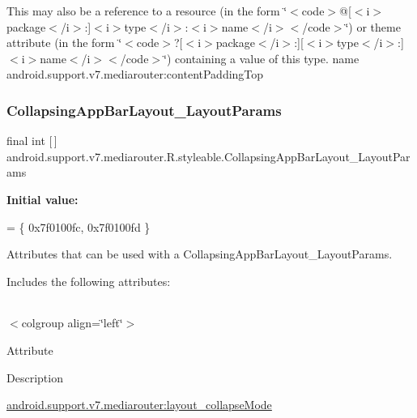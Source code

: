 This may also be a reference to a resource (in the form \char`\"{}$<$code$>$@\mbox{[}$<$i$>$package$<$/i$>$\+:\mbox{]}$<$i$>$type$<$/i$>$\+:$<$i$>$name$<$/i$>$$<$/code$>$\char`\"{}) or theme attribute (in the form \char`\"{}$<$code$>$?\mbox{[}$<$i$>$package$<$/i$>$\+:\mbox{]}\mbox{[}$<$i$>$type$<$/i$>$\+:\mbox{]}$<$i$>$name$<$/i$>$$<$/code$>$\char`\"{}) containing a value of this type.  name android.\+support.\+v7.\+mediarouter\+:content\+Padding\+Top \mbox{\label{classandroid_1_1support_1_1v7_1_1mediarouter_1_1R_1_1styleable_a3a8fc0e8f0991d8f2645deeb9a8cfbb6}} 
\subsubsection{\texorpdfstring{Collapsing\+App\+Bar\+Layout\+\_\+\+Layout\+Params}{CollapsingAppBarLayout\_LayoutParams}}
{\footnotesize\ttfamily final int \mbox{[}$\,$\mbox{]} android.\+support.\+v7.\+mediarouter.\+R.\+styleable.\+Collapsing\+App\+Bar\+Layout\+\_\+\+Layout\+Params\hspace{0.3cm}{\ttfamily [static]}}

{\bfseries Initial value\+:}
\begin{DoxyCode}
= \{
            0x7f0100fc, 0x7f0100fd
        \}
\end{DoxyCode}
Attributes that can be used with a Collapsing\+App\+Bar\+Layout\+\_\+\+Layout\+Params. 

Includes the following attributes\+:

\tabulinesep=1mm
\begin{longtabu} spread 0pt [c]{*{0}{|X[-1]}|}
\hline
\end{longtabu}
$<$colgroup align=\char`\"{}left\char`\"{}$>$ 

Attribute

Description 

{\ttfamily \hyperlink{classandroid_1_1support_1_1v7_1_1mediarouter_1_1R_1_1styleable_a3e5fbc3ee8d75862d538595291dd486d}{android.\+support.\+v7.\+mediarouter\+:layout\+\_\+collapse\+Mode}}

